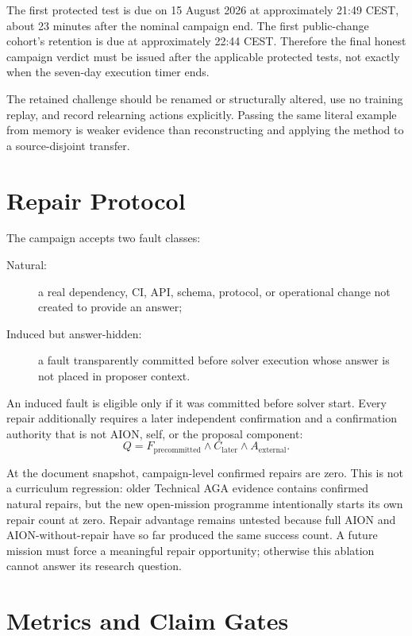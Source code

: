 \documentclass[11pt,a4paper]{article}
\begin{document}
The first protected test is due on 15 August 2026 at approximately 21:49 CEST,
about 23 minutes after the nominal campaign end.  The first public-change
cohort's retention is due at approximately 22:44 CEST.  Therefore the final
honest campaign verdict must be issued after the applicable protected tests,
not exactly when the seven-day execution timer ends.

The retained challenge should be renamed or structurally altered, use no
training replay, and record relearning actions explicitly.  Passing the same
literal example from memory is weaker evidence than reconstructing and applying
the method to a source-disjoint transfer.

\section{Repair Protocol}
\label{sec:repair}

The campaign accepts two fault classes:
\begin{description}
    \item[Natural:] a real dependency, CI, API, schema, protocol, or operational
          change not created to provide an answer;
    \item[Induced but answer-hidden:] a fault transparently committed before
          solver execution whose answer is not placed in proposer context.
\end{description}

An induced fault is eligible only if it was committed before solver start.
Every repair additionally requires a later independent confirmation and a
confirmation authority that is not AION, self, or the proposal component:
\begin{equation}
Q=F_{\mathrm{precommitted}}\land C_{\mathrm{later}}
\land A_{\mathrm{external}}.
\label{eq:repair}
\end{equation}

At the document snapshot, campaign-level confirmed repairs are zero.  This is
not a curriculum regression: older Technical AGA evidence contains confirmed
natural repairs, but the new open-mission programme intentionally starts its
own repair count at zero.  Repair advantage remains untested because full AION
and AION-without-repair have so far produced the same success count.  A future
mission must force a meaningful repair opportunity; otherwise this ablation
cannot answer its research question.

\section{Metrics and Claim Gates}
\label{sec:metrics}
\end{document}
